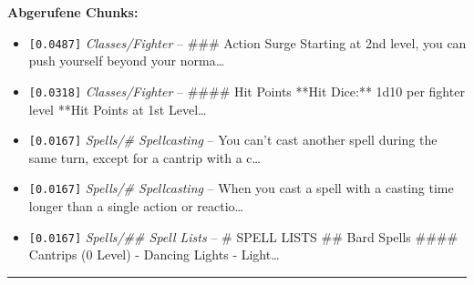 \noindent\textbf{Abgerufene Chunks:}
\begin{itemize}[noitemsep, topsep=2pt]
  \item[\textbf{\#1}] \texttt{[0.0487]} \textit{Classes/Fighter} -- \#\#\# Action Surge  Starting at 2nd level, you can push yourself beyond your norma\ldots
  \item[\textbf{\#2}] \texttt{[0.0318]} \textit{Classes/Fighter} -- \#\#\#\# Hit Points  **Hit Dice:** 1d10 per fighter level  **Hit Points at 1st Level\ldots
  \item[\textbf{\#3}] \texttt{[0.0167]} \textit{Spells/# Spellcasting} -- You can't cast another spell during the same turn, except for a cantrip with a c\ldots
  \item[\textbf{\#4}] \texttt{[0.0167]} \textit{Spells/# Spellcasting} -- When you cast a spell with a casting time longer than a single action or reactio\ldots
  \item[\textbf{\#5}] \texttt{[0.0167]} \textit{Spells/## Spell Lists} -- \# SPELL LISTS  \#\# Bard Spells  \#\#\#\# Cantrips (0 Level)  - Dancing Lights - Light\ldots
\end{itemize}
\vspace{4pt}
\hrule
\vspace{6pt}
